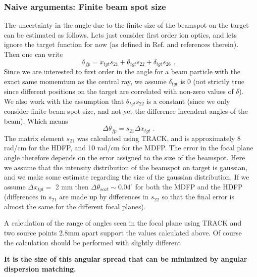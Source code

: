 \documentclass[11pt]{report}
\begin{document}
\subsubsection{Naive arguments: Finite beam spot size}
The uncertainty in the angle due to the finite size of the beamspot on the target can be estimated as follows.
Lets just consider  first order ion optics, and lets ignore the target function for now (as defined in Ref.\cite{Fuj02}
and references therein). Then one can write
\begin{equation} 
\theta_{fp}=  x_{tgt}s_{21} + \theta_{tgt}s_{22} + \delta_{tgt}s_{26}     \textrm{   .}
\end{equation} 
Since we are interested to first order in the angle for a beam particle with the exact same momemtum 
as the central ray, we assume $\delta_{tgt}$ is 0 (not strictly true since
different positions on the target are correlated with non-zero values of $\delta$). 
We also work with the assumption that $\theta_{tgt}s_{22}$ is a constant (since we only consider finite beam spot size,
and not yet the difference incendent angles of the beam).
Which means %
\begin{equation} 
\Delta\theta_{fp}= s_{21} \Delta x_{tgt}      \textrm{   .}
\end{equation} 
The matrix element $s_{21}$ was calculated using TRACK, and is approximately 8 rad/cm for the HDFP, and 10 rad/cm for
the MDFP. The error in the focal plane angle therefore depends on the error assigned to the size of the beamspot.
Here we assume that the intensity distribution of the beamspot on target is gaussian, and we make some estimate regarding
the size of the gaussian distribution. If we assume $\Delta x_{tgt}=$ 2 mm then  $\Delta\theta_{scat}\sim 0.04^{\circ}$
for both the MDFP and the HDFP (differences in $s_{21}$ are made up by differences in $s_{22}$ so that the final error 
is almost the same for the different focal planes).

A calculation of the range of angles seen in the focal plane using TRACK and two source points 2.8mm apart support the 
values calculated above. Of course the calculation should be performed with slightly different

{\bf It is the size of this angular spread that can be minimized by angular dispersion matching.}
\end{document}
